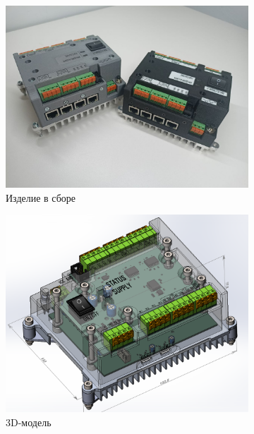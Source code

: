 \documentclass[16pt]{article}
\begin{document}
\begin{figure}
    \centering
    \begin{subfigure}{0.45\textwidth}
        \includegraphics[width=\textwidth]{solution.png}
        \caption{Изделие в сборе}
    \end{subfigure}
    \hfill
    \begin{subfigure}{0.45\textwidth}
        \includegraphics[width=\textwidth]{model.png}
        \caption{3D-модель}
        \label{fig:plc_board}
    \end{subfigure}
    \caption{}
\end{figure}
\end{document}
